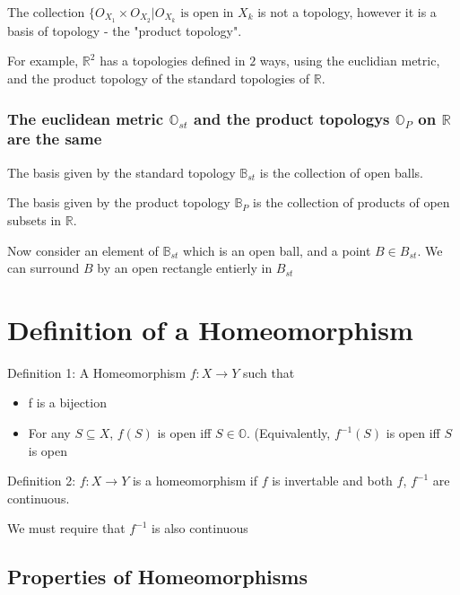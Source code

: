 \documentclass{homework}
\newcommand{\RR}{\mathbb{R}}
\newcommand{\BB}{\mathbb{B}}
\newcommand{\OO}{\mathbb{O}}
\begin{document}
The collection $\{O_{X_1} \times O_{X_2} | O_{X_k} \text{ is open in } X_k$ is not a topology, however it is a basis of topology - the "product topology".

For example, $\RR^2$ has a topologies defined in $2$ ways, using the euclidian metric, and the product topology of the standard topologies of $\RR$.

\subsubsection{The euclidean metric $\OO_{st}$ and the product topologys $\OO_P$ on $\RR$ are the same}

The basis given by the standard topology $\BB_{st}$ is the collection of open balls.

The basis given by the product topology $\BB_P$ is the collection of products of open subsets in $\RR$.

Now consider an element of $\BB_{st}$ which is an open ball, and a point $B \in B_{st}$. We can surround $B$ by an open rectangle entierly in $B_{st}$










\section{Definition of a Homeomorphism}

Definition 1: A Homeomorphism $f:X \rightarrow Y$ such that 
\begin{itemize}
    \item {f is a bijection}
    \item{For any $S \subseteq X$, $f(S)$ is open iff $S \in \OO$. (Equivalently, $f^{-1}(S)$ is open iff $S$ is open}
\end{itemize}

Definition 2: $f: X \rightarrow Y$ is a homeomorphism if $f$ is invertable and both $f$, $f^{-1}$ are continuous. 

We must require that $f^{-1}$ is also continuous




\subsection{Properties of Homeomorphisms}
\end{document}
